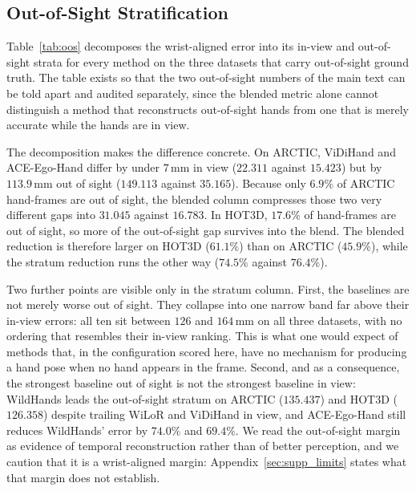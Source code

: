 \documentclass[10pt,twocolumn,letterpaper]{article}
\newcommand{\method}{ACE-Ego-Hand} %
\begin{document}
\subsection{Out-of-Sight Stratification}
\label{sec:supp_oos}
Table~\ref{tab:oos} decomposes the wrist-aligned error into its in-view and out-of-sight strata for every method on the three datasets that carry out-of-sight ground truth. The table exists so that the two out-of-sight numbers of the main text can be told apart and audited separately, since the blended metric alone cannot distinguish a method that reconstructs out-of-sight hands from one that is merely accurate while the hands are in view.

The decomposition makes the difference concrete. On ARCTIC, ViDiHand and \method{} differ by under $7$\,mm in view ($22.311$ against $15.423$) but by $113.9$\,mm out of sight ($149.113$ against $35.165$). Because only $6.9\%$ of ARCTIC hand-frames are out of sight, the blended column compresses those two very different gaps into $31.045$ against $16.783$. In HOT3D, $17.6\%$ of hand-frames are out of sight, so more of the out-of-sight gap survives into the blend. The blended reduction is therefore larger on HOT3D ($61.1\%$) than on ARCTIC ($45.9\%$), while the stratum reduction runs the other way ($74.5\%$ against $76.4\%$).

Two further points are visible only in the stratum column. First, the baselines are not merely worse out of sight. They collapse into one narrow band far above their in-view errors: all ten sit between $126$ and $164$\,mm on all three datasets, with no ordering that resembles their in-view ranking. This is what one would expect of methods that, in the configuration scored here, have no mechanism for producing a hand pose when no hand appears in the frame. Second, and as a consequence, the strongest baseline out of sight is not the strongest baseline in view: WildHands leads the out-of-sight stratum on ARCTIC ($135.437$) and HOT3D ($126.358$) despite trailing WiLoR and ViDiHand in view, and \method{} still reduces WildHands' error by $74.0\%$ and $69.4\%$. We read the out-of-sight margin as evidence of temporal reconstruction rather than of better perception, and we caution that it is a wrist-aligned margin: Appendix~\ref{sec:supp_limits} states what that margin does not establish.
\end{document}
